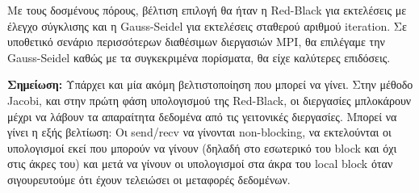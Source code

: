 \documentclass[../final_report.tex]{subfiles}
\begin{document}
Με τους δοσμένους πόρους, βέλτιση επιλογή θα ήταν η Red-Black για εκτελέσεις με έλεγχο σύγκλισης και η Gauss-Seidel για εκτελέσεις σταθερού αριθμού iteration.
Σε υποθετικό σενάριο περισσότερων διαθέσιμων διεργασιών MPI, θα επιλέγαμε την Gauss-Seidel καθώς με τα συγκεκριμένα πορίσματα, θα είχε καλύτερες επιδόσεις.

\textbf{Σημείωση:} Υπάρχει και μία ακόμη βελτιστοποίηση που μπορεί να γίνει. Στην μέθοδο Jacobi, και στην πρώτη φάση υπολογισμού της Red-Black, οι διεργασίες
μπλοκάρουν μέχρι να λάβουν τα απαραίτητα δεδομένα από τις γειτονικές διεργασίες. Μπορεί να γίνει η εξής βελτίωση: Οι send/recv να γίνονται non-blocking, να εκτελούνται
οι υπολογισμοί εκεί που μπορούν να γίνουν (δηλαδή στο εσωτερικό του block και όχι στις άκρες του) και μετά να γίνουν οι υπολογισμοί στα άκρα του local block όταν σιγουρευτούμε
ότι έχουν τελειώσει οι μεταφορές δεδομένων.
\end{document}
